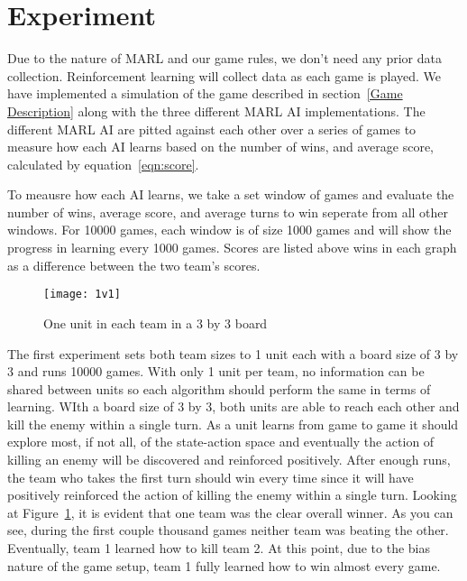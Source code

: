 \section{Experiment}

Due to the nature of MARL and our game rules, we don't need any prior data collection. Reinforcement learning will collect data as each game is played. We have implemented a simulation of the game described in section~\ref{Game Description} along with the three different MARL AI implementations. The different MARL AI are pitted against each other over a series of games to measure how each AI learns based on the number of wins, and average score, calculated by equation~\ref{eqn:score}.

To meausre how each AI learns, we take a set window of games and evaluate the number of wins, average score, and average turns to win seperate from all other windows. For 10000 games, each window is of size 1000 games and will show the progress in learning every 1000 games. Scores are listed above wins in each graph as a difference between the two team's scores.

 \begin{figure}[htb]

\begin{minipage}[b]{1.0\linewidth}
  \centering
  \centerline{\texttt{[image: 1v1]}}
  
\end{minipage}
\caption{One unit in each team in a 3 by 3 board}
\label{fig:1v1}
%
\end{figure}

The first experiment sets both team sizes to 1 unit each with a board size of 3 by 3 and runs 10000 games. With only 1 unit per team, no information can be shared between units so each algorithm should perform the same in terms of learning. WIth a board size of 3 by 3, both units are able to reach each other and kill the enemy within a single turn. As a unit learns from game to game it should explore most, if not all, of the state-action space and eventually the action of killing an enemy will be discovered and reinforced positively. After enough runs, the team who takes the first turn should win every time since it will have positively reinforced the action of killing the enemy within a single turn. Looking at Figure~\ref{fig:1v1}, it is evident that one team was the clear overall winner. As you can see, during the first couple thousand games neither team was beating the other. Eventually, team 1 learned how to kill team 2. At this point, due to the bias nature of the game setup, team 1 fully learned how to win almost every game.



